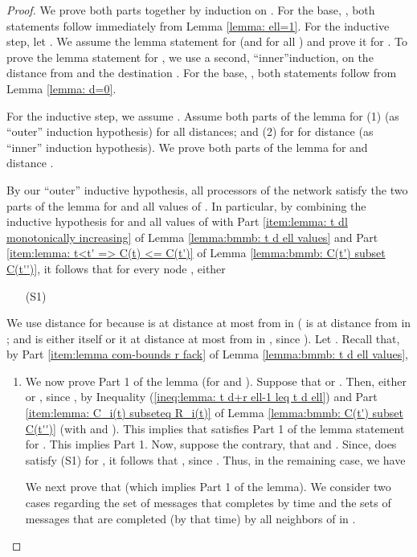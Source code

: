 \begin{proof}
We prove both parts together by induction on .
For the base, , both statements follow
immediately from Lemma \ref{lemma: ell=1}.
For the inductive step, let .
We assume the lemma
statement for  (and for all ) and prove it for .
To prove the lemma statement for , we use a second, ``inner''induction, on the distance
 from  and the destination .
For the base, , both statements
follow from Lemma \ref{lemma: d=0}.


For the inductive step, we assume .
Assume both parts of the lemma for
(1)  (as ``outer'' induction hypothesis) for all distances;
and (2) for  for distance  (as ``inner'' induction hypothesis).
We prove both parts of the lemma for  and distance .


By our ``outer'' inductive hypothesis, all processors of the network satisfy the two parts of the lemma for  and all values of .
In particular, by combining the inductive hypothesis for   and all values of  with
Part \ref{item:lemma: t dl monotonically increasing} of Lemma \ref{lemma:bmmb: t d ell values} and
Part \ref{item:lemma: t<t' => C(t) <= C(t')} of Lemma \ref{lemma:bmmb: C(t') subset C(t'')},
it follows that for every node ,
either
\begin{itemize}

\item [(S1)] 

\end{itemize}
We use distance  for  because  is at distance at most  from  in 
( is at distance  from  in ; and  is either  itself or it at distance at most  from  in , since ).
Let .
Recall that,
by Part \ref{item:lemma com-bounds r fack} of Lemma \ref{lemma:bmmb: t d ell values},


\begin{enumerate}

\item We now prove Part 1 of the lemma (for  and ).
Suppose that   or .
Then, either
 or ,
since ,
by Inequality (\ref{ineq:lemma: t d+r ell-1 leq t d ell}) and Part \ref{item:lemma: C_i(t) subseteq R_i(t)} of Lemma \ref{lemma:bmmb: C(t') subset C(t'')}
(with  and ).
This implies that  satisfies Part 1 of the lemma statement for . This implies Part 1.
Now, suppose the contrary, that  and .
Since,  does satisfy (S1) for , it follows that ,  since .
Thus, in the remaining case, we have

We next prove that  (which implies Part 1 of the lemma).
We consider two cases regarding the set of messages that  completes by time 
and the sets of messages that are completed (by that time) by all neighbors of  in .




\end{enumerate}
\end{proof}
